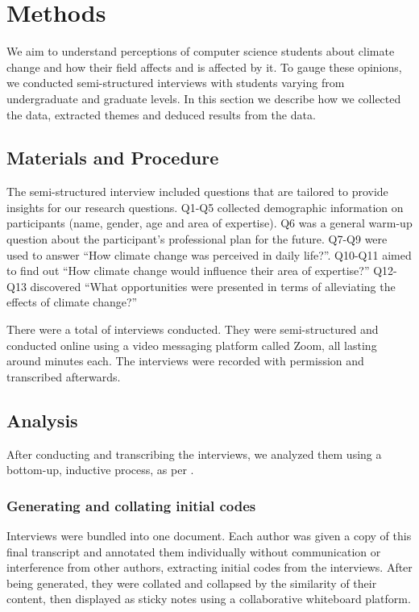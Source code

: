 

\section{Methods}

We aim to understand perceptions of computer science students about climate change and how their field affects and is affected by it. To gauge these opinions, we conducted semi-structured interviews with students varying from undergraduate and graduate levels. In this section we describe how we collected the data, extracted themes and deduced results from the data.

\subsection{Materials and Procedure}
The semi-structured interview included  questions that are tailored to provide insights for our research questions. Q1-Q5 collected demographic information on participants (name, gender, age and area of expertise). Q6 was a general warm-up question about the participant’s professional plan for the future. Q7-Q9 were used to answer “How climate change was perceived in daily life?”. Q10-Q11 aimed to find out “How climate change would influence their area of expertise?” Q12-Q13 discovered “What opportunities were presented in terms of alleviating the effects of climate change?”

There were a total of  interviews conducted. They were semi-structured and conducted online using a video messaging platform called Zoom, all lasting around  minutes each. The interviews were recorded with permission and transcribed afterwards. 


\subsection{Analysis}
After conducting and transcribing the interviews, we analyzed them using a bottom-up, inductive process, as per \citet{braun2006using}.

\subsubsection{Generating and collating initial codes} Interviews were bundled into one document. Each author was given a copy of this final transcript and annotated them individually without communication or interference from other authors, extracting initial codes from the interviews. After being generated, they were collated and collapsed by the similarity of their content, then displayed as sticky notes using a collaborative whiteboard platform.

